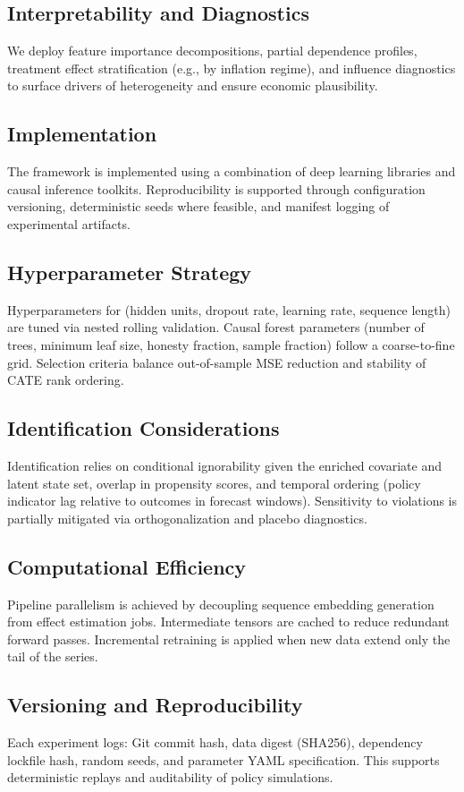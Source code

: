 \subsection{Interpretability and Diagnostics}
We deploy feature importance decompositions, partial dependence profiles, treatment effect stratification (e.g., by inflation regime), and influence diagnostics to surface drivers of heterogeneity and ensure economic plausibility.

\subsection{Implementation}
The framework is implemented using a combination of deep learning libraries and causal inference toolkits. Reproducibility is supported through configuration versioning, deterministic seeds where feasible, and manifest logging of experimental artifacts.

\subsection{Hyperparameter Strategy}
Hyperparameters for \LSTM{} (hidden units, dropout rate, learning rate, sequence length) are tuned via nested rolling validation. Causal forest parameters (number of trees, minimum leaf size, honesty fraction, sample fraction) follow a coarse-to-fine grid. Selection criteria balance out-of-sample MSE reduction and stability of CATE rank ordering.

\subsection{Identification Considerations}
Identification relies on conditional ignorability given the enriched covariate and latent state set, overlap in propensity scores, and temporal ordering (policy indicator lag relative to outcomes in forecast windows). Sensitivity to violations is partially mitigated via orthogonalization and placebo diagnostics.

\subsection{Computational Efficiency}
Pipeline parallelism is achieved by decoupling sequence embedding generation from effect estimation jobs. Intermediate tensors are cached to reduce redundant forward passes. Incremental retraining is applied when new data extend only the tail of the series.

\subsection{Versioning and Reproducibility}
Each experiment logs: Git commit hash, data digest (SHA256), dependency lockfile hash, random seeds, and parameter YAML specification. This supports deterministic replays and auditability of policy simulations.
